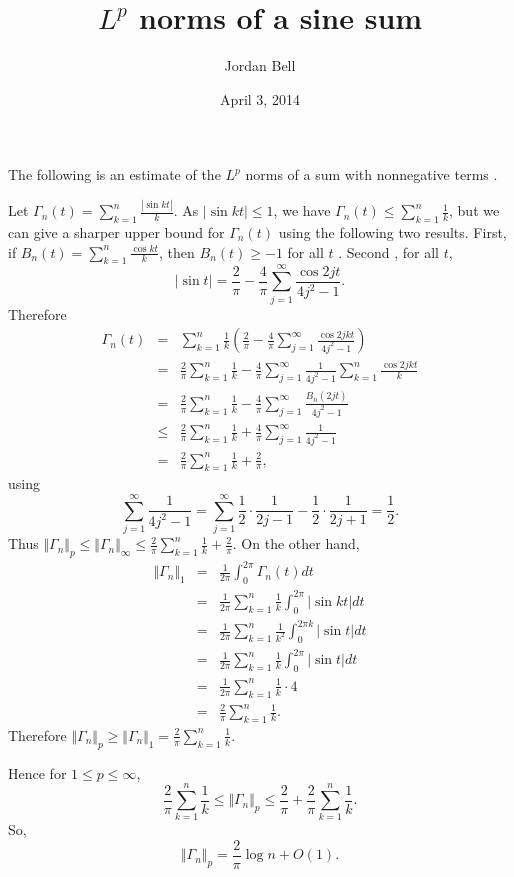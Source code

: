\documentclass{article}
\newcommand{\norm}[1]{\Vert #1 \Vert}
\begin{document}
\title{$L^p$ norms of a sine sum}
\author{Jordan Bell}
\date{April 3, 2014}
\maketitle

The following is an estimate of the $L^p$ norms of a sum with nonnegative terms \cite[p. 77, no. 38]{polya}.

Let $\Gamma_n(t)=\sum_{k=1}^n \frac{|\sin kt|}{k}$. As $|\sin kt| \leq 1$, we have $\Gamma_n(t) \leq \sum_{k=1}^n \frac{1}{k}$, but we can
give a sharper upper bound for $\Gamma_n(t)$ using the following two results.
First, if $B_n(t)=\sum_{k=1}^n \frac{\cos kt}{k}$, then $B_n(t) \geq  -1$ for all $t$ \cite[p.~75, no.~28]{polya}.
Second  \cite[p.~76, no.~34]{polya}, for all $t$,
\[
|\sin t|=\frac{2}{\pi}-\frac{4}{\pi}\sum_{j=1}^\infty \frac{\cos 2jt}{4j^2-1}.
\]
Therefore
\begin{eqnarray*}
\Gamma_n(t)&=&\sum_{k=1}^n \frac{1}{k} \left( \frac{2}{\pi}-\frac{4}{\pi} \sum_{j=1}^\infty \frac{\cos 2jkt}{4j^2-1} \right)\\
&=&\frac{2}{\pi}\sum_{k=1}^n \frac{1}{k}-\frac{4}{\pi}\sum_{j=1}^\infty \frac{1}{4j^2-1} \sum_{k=1}^n \frac{\cos 2jkt}{k}\\
&=&\frac{2}{\pi}\sum_{k=1}^n \frac{1}{k}-\frac{4}{\pi}\sum_{j=1}^\infty \frac{B_n(2jt)}{4j^2-1}\\
&\leq&\frac{2}{\pi}\sum_{k=1}^n \frac{1}{k}+\frac{4}{\pi}\sum_{j=1}^\infty \frac{1}{4j^2-1}\\
&=&\frac{2}{\pi}\sum_{k=1}^n \frac{1}{k}+\frac{2}{\pi},
\end{eqnarray*}
using 
\[
\sum_{j=1}^\infty \frac{1}{4j^2-1}=
\sum_{j=1}^\infty \frac{1}{2}\cdot \frac{1}{2j-1}-\frac{1}{2}\cdot \frac{1}{2j+1} 
=
\frac{1}{2}.
\]
Thus $\norm{\Gamma_n}_p \leq \norm{\Gamma_n}_\infty \leq \frac{2}{\pi}\sum_{k=1}^n \frac{1}{k}+\frac{2}{\pi}$.
On the other hand, 
\begin{eqnarray*}
\norm{\Gamma_n}_1&=&\frac{1}{2\pi}\int_0^{2\pi} \Gamma_n(t) dt\\
&=&\frac{1}{2\pi} \sum_{k=1}^n \frac{1}{k} \int_0^{2\pi} |\sin kt| dt\\
&=&\frac{1}{2\pi} \sum_{k=1}^n \frac{1}{k^2} \int_0^{2\pi k} |\sin t| dt\\
&=&\frac{1}{2\pi} \sum_{k=1}^n \frac{1}{k} \int_0^{2\pi} |\sin t| dt\\
&=&\frac{1}{2\pi} \sum_{k=1}^n \frac{1}{k} \cdot 4\\
&=&\frac{2}{\pi}\sum_{k=1}^n \frac{1}{k}. 
\end{eqnarray*}
Therefore $\norm{\Gamma_n}_p \geq \norm{\Gamma_n}_1= \frac{2}{\pi}\sum_{k=1}^n \frac{1}{k}$.

Hence for $1 \leq p \leq \infty$,
\[
 \frac{2}{\pi}\sum_{k=1}^n \frac{1}{k} \leq \norm{\Gamma_n}_p \leq \frac{2}{\pi}+ \frac{2}{\pi}\sum_{k=1}^n \frac{1}{k}.
\]
So,
\[
\norm{\Gamma_n}_p = \frac{2}{\pi} \log n + O(1).
\]



\end{document}
